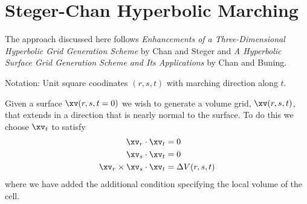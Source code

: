 \clearpage
\section{Steger-Chan Hyperbolic Marching}\label{sec:StegerChan}

The approach discussed here follows {\sl Enhancements of a Three-Dimensional Hyperbolic Grid
Generation Scheme} by Chan and Steger\cite{Chan92} and
{\sl A Hyperbolic Surface Grid Generation Scheme and Its Applications} by Chan and Buning\cite{Chan94}.


Notation: Unit square coodinates $(r,s,t)$ with marching direction along $t$. 

Given a surface $\xv(r,s,t=0)$ we wish to generate a volume grid, $\xv(r,s,t)$, that extends
in a direction that is nearly normal to the surface. To do this we choose $\xv_t$ to satisfy
\begin{align}
   \xv_r \cdot \xv_t & = 0 \\
   \xv_s \cdot \xv_t & = 0 \\
   \xv_r \times \xv_s \cdot \xv_t & = \Delta V(r,s,t)  \label{hype1}
\end{align}   
where we have added the additional condition specifying the local volume of the cell.

